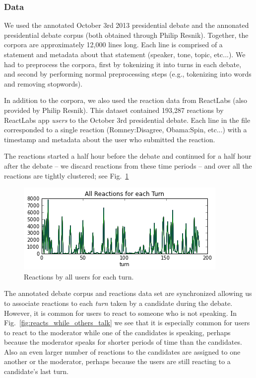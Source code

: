 
\subsubsection{Data}

We used the annotated October 3rd 2013 presidential debate and the annonated presidential debate corpus (both obtained through Philip Resnik).
Together, the corpora are approximately 12,000 lines long.
Each line is comprised of a statement and metadata about that statement (speaker, tone, topic, etc...).
We had to preprocess the corpora, first by tokenizing it into turns in each debate, and second by performing normal preprocessing steps (e.g., tokenizing into words and removing stopwords).

In addition to the corpora, we also used the reaction data from ReactLabs (also provided by Philip Resnik).
This dataset contained 193,287 reactions by ReactLabs app \emph{users} to the October 3rd presidential debate.
Each line in the file corresponded to a single reaction (Romney:Disagree, Obama:Spin, etc...) with a timestamp and metadata about the user who submitted the reaction.

The reactions started a half hour before the debate and continued for a half hour after the debate -- we discard reactions from these time periods -- and over all the reactions are tightly clustered; see Fig.~\ref{fig:reactionseachturn}

\begin{figure}[]
	\centering
	\includegraphics[scale=0.6]{Figures/reactions_for_each_turn.png}
	\caption{Reactions by all users for each turn.}
	\label{fig:reactionseachturn}
\end{figure}

The annotated debate corpus and reactions data set are synchronized allowing us to associate reactions to each \emph{turn} taken by a candidate during the debate.  However, it is common for users to react to someone who is not speaking.  In Fig.~\ref{fig:reacts_while_others_talk} we see that it is especially common for users to react to the moderator while one of the candidates is speaking, perhaps because the moderator speaks for shorter periods of time than the candidates.  Also an even larger number of reactions to the candidates are assigned to one another or the moderator, perhaps because the users are still reacting to a candidate's last turn.

